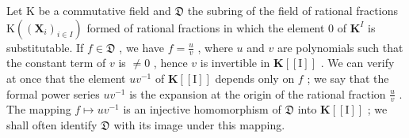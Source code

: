 Let K be a commutative field and \(\mathfrak{D}\) the subring of the field of rational fractions \(\mathrm{K}((\mathbf{X}_i)_{i\in I})\) formed of rational fractions in which the element 0 of \(\mathbf{K}^I\) is substitutable. If \(f\in \mathfrak{D}\) , we have \(f = \frac{u}{v}\) , where \(u\) and \(v\) are polynomials such that the constant term of \(v\) is \(\neq 0\) , hence \(v\) is invertible in \(\mathbf{K}[[\mathrm{I}]]\) . We can verify at once that the element \(uv^{-1}\) of \(\mathbf{K}[[\mathrm{I}]]\) depends only on \(f\) ; we say that the formal power series \(uv^{-1}\) is the expansion at the origin of the rational fraction \(\frac{u}{v}\) . The mapping \(f\mapsto uv^{-1}\) is an injective homomorphism of \(\mathfrak{D}\) into \(\mathbf{K}[[\mathrm{I}]]\) ; we shall often identify \(\mathfrak{D}\) with its image under this mapping.

